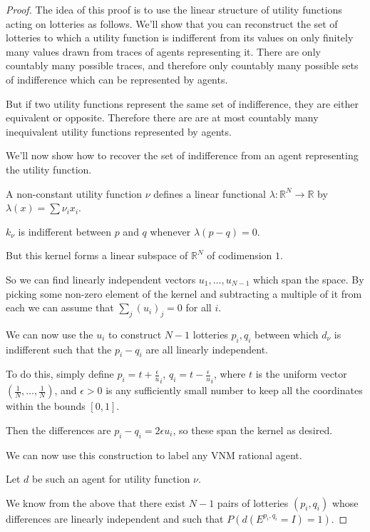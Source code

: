 \begin{proof}
The idea of this proof is to use the linear structure of utility functions
acting on lotteries as follows. We'll show that you can reconstruct the
set of lotteries to which a utility function is indifferent from its
values on only finitely many values drawn from traces of agents representing
it. There are only countably many possible traces, and therefore only
countably many possible sets of indifference which can be
represented by agents.

But if two utility functions represent the same set of indifference, they
are either equivalent or opposite. Therefore there are are at most
countably many inequivalent utility functions represented by agents.

We'll now show how to recover the set of indifference from an agent
representing the utility function.

A non-constant utility function $\nu$ defines a linear functional
$\lambda: \mathbb{R}^N \to \mathbb{R}$ by $\lambda(x) = \sum \nu_i x_i$.

$k_\nu$ is indifferent between $p$ and $q$ whenever $\lambda(p - q) = 0$.

But this kernel forms a linear subspace of $\mathbb{R}^N$ of codimension $1$.

So we can find linearly independent vectors $u_1, \ldots, u_{N-1}$ which span
the space. By picking some non-zero element of the kernel and subtracting a
multiple of it from each we can assume that $\sum\limits_j (u_i)_j = 0$ for
all $i$.

We can now use the $u_i$ to construct $N - 1$ lotteries $p_i, q_i$ between
which $d_\nu$ is indifferent such that the $p_i - q_i$ are all linearly
independent.

To do this, simply define $p_i = t + \frac{\epsilon} u_i$,
$q_i = t - \frac{\epsilon} u_i$, where $t$ is the uniform vector
$(\frac{1}{N}, \ldots, \frac{1}{N})$, and $\epsilon > 0$ is any
sufficiently small number to keep all the coordinates within the bounds
$[0, 1]$.

Then the differences are $p_i - q_i = 2\epsilon u_i$, so these span the
kernel as desired.

We can now use this construction to label any VNM rational agent.

Let $d$ be such an agent for utility function $\nu$.

We know from the above that there exist $N - 1$ pairs of lotteries $(p_i, q_i)$
whose differences are linearly independent and such that
$P(d(E^{p_i, q_i} = I) = 1)$.


\end{proof}
